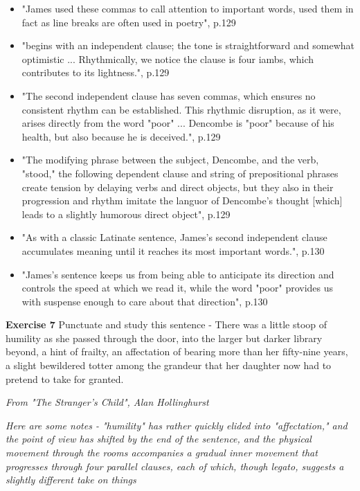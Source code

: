 \documentclass[11pt]{article}
\newenvironment{narrow}[2]{%
 \begin{list}{}{%
  \setlength{\topsep}{0pt}%
  \setlength{\leftmargin}{#1}%
  \setlength{\rightmargin}{#2}%
  \setlength{\listparindent}{\parindent}%
  \setlength{\itemindent}{\parindent}%
  \setlength{\parsep}{\parskip}%
 }%
\item[]}{\end{list}}
\begin{document}
\begin{itemize}
\item     "James used these commas to call attention to important words,
    used them in fact as line breaks are often used in poetry", p.129
\item      "begins with an independent clause; the tone is straightforward
    and somewhat optimistic ... Rhythmically, we notice the clause is
    four iambs, which contributes to its lightness.", p.129 
\item  "The
    second independent clause has seven commas, which ensures no
    consistent rhythm can be established. This rhythmic disruption, as
    it were, arises directly from the word "poor" ... Dencombe
    is "poor" because of his health, but also because he is
    deceived.", p.129 
\item  "The modifying phrase between the subject,
    Dencombe, and the verb, "stood," the following dependent clause
    and string of prepositional phrases create tension by delaying
    verbs and direct objects, but they also in their progression and
    rhythm imitate the languor of Dencombe's thought [which] leads to
    a slightly humorous direct object", p.129 
\item  "As with a classic
    Latinate sentence, James's second independent clause accumulates
    meaning until it reaches its most important words.", p.130
\item   "James's sentence keeps us from being able to anticipate its
    direction and controls the speed at which we read it, while the
    word "poor" provides us with suspense enough to care about that
    direction", p.130 
\end{itemize}

\begin{narrow}{1.0cm}{1.0cm}
\textbf{Exercise 7} Punctuate and study this sentence - There was a little stoop of humility 
as she passed through the door, into the larger but darker library beyond, a 
hint of frailty, an affectation of bearing more than her fifty-nine years, a 
slight bewildered totter among the grandeur that her daughter now had to 
pretend to take for granted.
\end{narrow}

\textit{ From "The Stranger's Child", Alan Hollinghurst }



\textit{Here are some notes - "humility" has rather quickly elided into "affectation," and the point of view has shifted by the end of the sentence, and the physical movement through the rooms accompanies a gradual inner movement that progresses through four parallel clauses, each of which, though legato, suggests a slightly different take on things}
\end{document}
